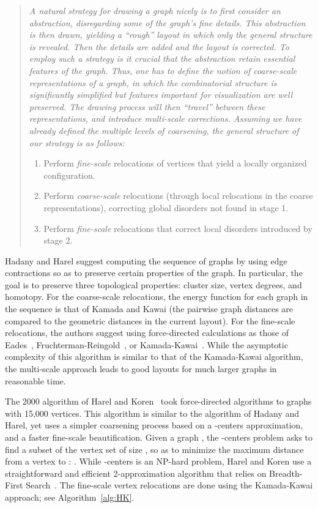 \documentclass[notitlepage,letter,11pt]{article}
\begin{document}
\begin{quote}
{\em
A natural strategy for drawing a graph nicely is to first consider an abstraction, disregarding some of the graph's fine details. This abstraction is then drawn, yielding a ``rough'' layout in which only the general structure is revealed. Then the details are added and the layout is corrected. To employ such a strategy is it crucial that the abstraction retain essential features of the graph. Thus, one has to define the notion of coarse-scale representations of a graph, in which the combinatorial structure is significantly simplified but features important for visualization are well preserved. The drawing process will then ``travel'' between these representations, and introduce multi-scale corrections. Assuming we have already defined the multiple levels of coarsening, the general structure of our strategy is as follows:
\begin{enumerate}
\item Perform {\em fine-scale} relocations of vertices that yield a locally organized configuration.
\item Perform {\em coarse-scale} relocations (through local relocations in the coarse representations), correcting global disorders not found in stage 1.
\item Perform {\em fine-scale} relocations that correct local disorders introduced by stage 2.
\end{enumerate}
}\end{quote}

Hadany and Harel suggest computing the sequence of graphs by using
edge contractions so as to preserve certain properties of the
graph. In particular, the goal is to preserve three topological
properties: cluster size, vertex degrees, and homotopy. For the
coarse-scale relocations, the energy function for each graph in the
sequence is that of Kamada and Kawai (the pairwise graph distances are
compared to the geometric distances in the current layout). For the
fine-scale relocations, the authors suggest using force-directed
calculations as those of Eades~\cite{Eades+1984a},
Fruchterman-Reingold~\cite{fr-gdfdp-91}, or
Kamada-Kawai~\cite{kk-adgug-89}. While the asymptotic complexity of
this algorithm is similar to that of the Kamada-Kawai algorithm, the
multi-scale approach leads to good layouts for much larger graphs in
reasonable time. 

The 2000 algorithm of Harel and Koren~\cite{hk-fmsmd-j-02} took
force-directed algorithms to graphs with 15,000 vertices. This
algorithm is similar to the algorithm of Hadany and Harel, yet uses a
simpler coarsening process based on a -centers approximation, and a
faster fine-scale beautification. Given a graph , the
-centers problem asks to find a subset of the vertex set
 of size , so as to minimize the maximum distance
from a vertex to : .
While -centers is an NP-hard problem, Harel and Koren use a
straightforward and efficient 2-approximation algorithm that relies on
Breadth-First Search~\cite{Hochbaum-96}. The fine-scale vertex
relocations are done using the Kamada-Kawai approach; see Algorithm~\ref{alg:HK}.
\end{document}
